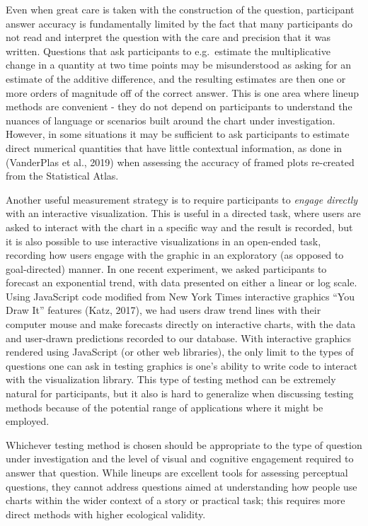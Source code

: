 \documentclass[
  10pt,
  letterpaper,
  DIV=11,
  numbers=noendperiod]{scrartcl}
\begin{document}
Even when great care is taken with the construction of the question,
participant answer accuracy is fundamentally limited by the fact that
many participants do not read and interpret the question with the care
and precision that it was written. Questions that ask participants to
e.g.~estimate the multiplicative change in a quantity at two time points
may be misunderstood as asking for an estimate of the additive
difference, and the resulting estimates are then one or more orders of
magnitude off of the correct answer. This is one area where lineup
methods are convenient - they do not depend on participants to
understand the nuances of language or scenarios built around the chart
under investigation. However, in some situations it may be sufficient to
ask participants to estimate direct numerical quantities that have
little contextual information, as done in (VanderPlas et al., 2019) when
assessing the accuracy of framed plots re-created from the Statistical
Atlas.

Another useful measurement strategy is to require participants to
\emph{engage directly} with an interactive visualization. This is useful
in a directed task, where users are asked to interact with the chart in
a specific way and the result is recorded, but it is also possible to
use interactive visualizations in an open-ended task, recording how
users engage with the graphic in an exploratory (as opposed to
goal-directed) manner. In one recent experiment, we asked participants
to forecast an exponential trend, with data presented on either a linear
or log scale. Using JavaScript code modified from New York Times
interactive graphics ``You Draw It'' features (Katz, 2017), we had users
draw trend lines with their computer mouse and make forecasts directly
on interactive charts, with the data and user-drawn predictions recorded
to our database. With interactive graphics rendered using JavaScript (or
other web libraries), the only limit to the types of questions one can
ask in testing graphics is one's ability to write code to interact with
the visualization library. This type of testing method can be extremely
natural for participants, but it also is hard to generalize when
discussing testing methods because of the potential range of
applications where it might be employed.

Whichever testing method is chosen should be appropriate to the type of
question under investigation and the level of visual and cognitive
engagement required to answer that question. While lineups are excellent
tools for assessing perceptual questions, they cannot address questions
aimed at understanding how people use charts within the wider context of
a story or practical task; this requires more direct methods with higher
ecological validity.
\end{document}
